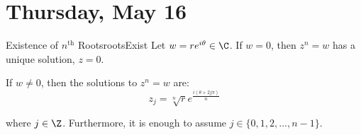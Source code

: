 \section{Thursday, May 16}



\begin{thmbo}{Existence of $n^{\text{th}}$ Roots}{rootsExist} 
Let $w = re^{i\theta} \in \C$. If $w = 0$, then $z^n = w$ has a unique solution, $z = 0$.

If $w\ne 0$, then the solutions to $z^n = w$ are:
$$z_j = \sqrt[n]{r}e^{\frac{i(\theta + 2j\pi)}{n}}$$

\noin where $j \in \Z$. Furthermore, it is enough to assume $j\in \{0,1,2,\dots,n-1\}$.
\end{thmbo}


